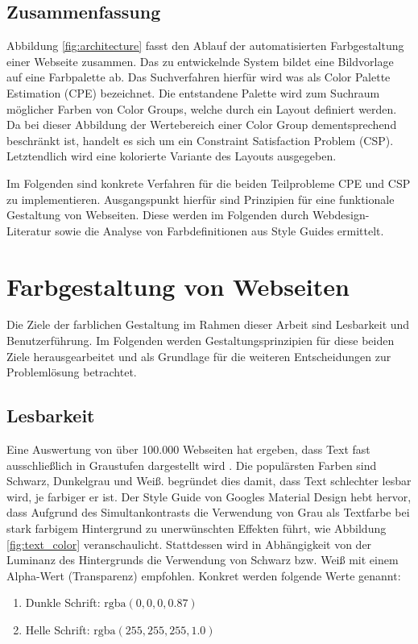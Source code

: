 \documentclass[11pt,a4paper,bibliography=totoc,twocolumn]{scrartcl}
\begin{document}
\subsection*{Zusammenfassung}

Abbildung \ref{fig:architecture} fasst den Ablauf der automatisierten Farbgestaltung einer Webseite zusammen. Das zu entwickelnde System bildet eine Bildvorlage auf eine Farbpalette ab. Das Suchverfahren hierfür wird was als Color Palette Estimation (CPE) bezeichnet. Die entstandene Palette wird zum Suchraum möglicher Farben von Color Groups, welche durch ein Layout definiert werden. Da bei dieser Abbildung der Wertebereich einer Color Group dementsprechend beschränkt ist, handelt es sich um ein Constraint Satisfaction Problem (CSP). Letztendlich wird eine kolorierte Variante des Layouts ausgegeben.

Im Folgenden sind konkrete Verfahren für die beiden Teilprobleme CPE und CSP zu implementieren. Ausgangspunkt hierfür sind Prinzipien für eine funktionale Gestaltung von Webseiten. Diese werden im Folgenden durch Webdesign-Literatur sowie die Analyse von Farbdefinitionen aus Style Guides ermittelt.

\section{Farbgestaltung von Webseiten}
Die Ziele der farblichen Gestaltung im Rahmen dieser Arbeit sind Lesbarkeit und Benutzerführung. Im Folgenden werden Gestaltungsprinzipien für diese beiden Ziele herausgearbeitet und als Grundlage für die weiteren Entscheidungen zur Problemlösung betrachtet.

\subsection{Lesbarkeit}
\label{sec:lesbarkeit}

Eine Auswertung von über 100.000 Webseiten hat ergeben, dass Text fast ausschließlich in Graustufen dargestellt wird \citep{webzeitgeist}. Die populärsten Farben sind Schwarz, Dunkelgrau und Weiß. \citet{webdesign} begründet dies damit, dass Text schlechter lesbar wird, je farbiger er ist. Der Style Guide von Googles Material Design \citep{google} hebt hervor, dass Aufgrund des Simultankontrasts die Verwendung von Grau als Textfarbe bei stark farbigem Hintergrund zu unerwünschten Effekten führt, wie Abbildung \ref{fig:text_color} veranschaulicht. Stattdessen wird in Abhängigkeit von der Luminanz des Hintergrunds die Verwendung von Schwarz bzw. Weiß mit einem Alpha-Wert (Transparenz) empfohlen. Konkret werden folgende Werte genannt:
\begin{enumerate}
	\item Dunkle Schrift: $\text{rgba}(0, 0, 0, 0.87)$
	\item Helle Schrift: $\text{rgba}(255, 255, 255, 1.0)$
\end{enumerate}
\end{document}
